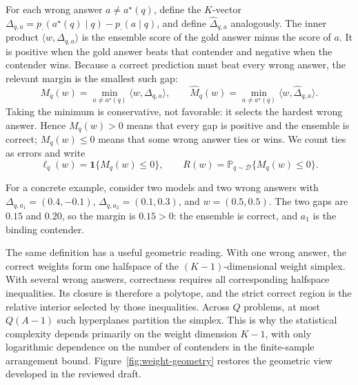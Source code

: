 For each wrong answer \(a\ne a^\star(q)\), define the \(K\)-vector
\(\Delta_{q,a}=p_\cdot(a^\star(q)\mid q)-p_\cdot(a\mid q)\), and define
\(\widehat\Delta_{q,a}\) analogously.  The inner product
\(\langle w,\Delta_{q,a}\rangle\) is the ensemble score of the gold answer
minus the score of \(a\).  It is positive when the gold answer beats that
contender and negative when the contender wins.  Because a correct prediction
must beat every wrong answer, the relevant margin is the smallest such gap:
\begin{equation}
M_q(w)=\min_{a\ne a^\star(q)}\langle w,\Delta_{q,a}\rangle,
\qquad
\widehat M_q(w)=
\min_{a\ne a^\star(q)}
\langle w,\widehat\Delta_{q,a}\rangle.
\label{eq:margins}
\end{equation}
Taking the minimum is conservative, not favorable: it selects the hardest
wrong answer.  Hence \(M_q(w)>0\) means that every gap is positive and the
ensemble is correct; \(M_q(w)\le0\) means that some wrong answer ties or wins.
We count ties as errors and write
\begin{equation}
\ell_q(w)=\mathbf 1\{M_q(w)\le0\},
\qquad
R(w)=\mathbb P_{q\sim\mathcal D}\{M_q(w)\le0\}.
\label{eq:risk}
\end{equation}

For a concrete example, consider two models and two wrong answers with
\(\Delta_{q,a_1}=(0.4,-0.1)\), \(\Delta_{q,a_2}=(0.1,0.3)\), and
\(w=(0.5,0.5)\).  The two gaps are \(0.15\) and \(0.20\), so the margin is
\(0.15>0\): the ensemble is correct, and \(a_1\) is the binding contender.

The same definition has a useful geometric reading.  With one wrong answer,
the correct weights form one halfspace of the \((K-1)\)-dimensional weight
simplex.  With several wrong answers, correctness requires all corresponding
halfspace inequalities.  Its closure is therefore a polytope, and the strict
correct region is the relative interior selected by those inequalities.
Across \(Q\) problems, at most \(Q(A-1)\) such hyperplanes partition the
simplex.  This is why the statistical complexity depends primarily on the
weight dimension \(K-1\), with only logarithmic dependence on the number of
contenders in the finite-sample arrangement bound.  Figure~\ref{fig:weight-geometry}
restores the geometric view developed in the reviewed draft.

